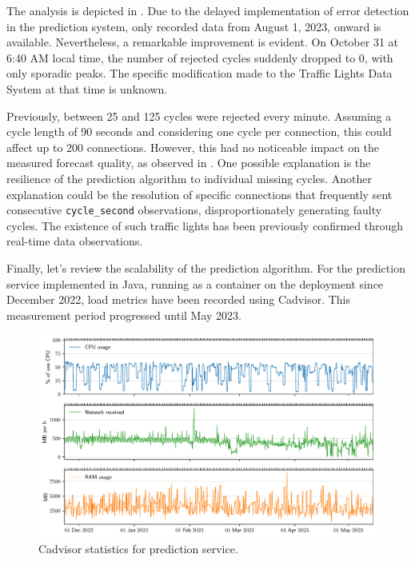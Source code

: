 The analysis is depicted in . Due to the delayed implementation of error detection in the prediction system, only recorded data from August 1, 2023, onward is available. Nevertheless, a remarkable improvement is evident. On October 31 at 6:40 AM local time, the number of rejected cycles suddenly dropped to 0, with only sporadic peaks. The specific modification made to the Traffic Lights Data System at that time is unknown.

Previously, between 25 and 125 cycles were rejected every minute. Assuming a cycle length of 90 seconds and considering one cycle per connection, this could affect up to 200 connections. However, this had no noticeable impact on the measured forecast quality, as observed in . One possible explanation is the resilience of the prediction algorithm to individual missing cycles. Another explanation could be the resolution of specific connections that frequently sent consecutive \texttt{cycle\_second} observations, disproportionately generating faulty cycles. The existence of such traffic lights has been previously confirmed through real-time data observations.

Finally, let's review the scalability of the prediction algorithm. For the prediction service implemented in Java, running as a container on the deployment since December 2022, load metrics have been recorded using Cadvisor. This measurement period progressed until May 2023.

\begin{figure}[htbp]
    \centering
    \includegraphics[width=\linewidth]{images/monitoring-prediction-service-load.pdf}
    \caption{Cadvisor statistics for prediction service.}\label{fig:monitoring-prediction-service-load}
\end{figure}

